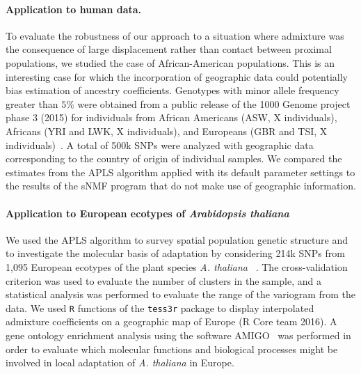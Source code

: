 \paragraph{Application to human data.} To evaluate the robustness of our
approach to a situation where admixture was the consequence of large
displacement rather than contact between proximal populations, we studied the
case of African-American populations. This is an interesting case for which the
incorporation of geographic data could potentially bias estimation of ancestry
coefficients. Genotypes with minor allele frequency greater than $5 \%$ were
obtained from a public release of the
1000 Genome project phase 3 (2015) for individuals from African Americans (ASW,
X individuals), Africans (YRI and LWK, X individuals), and Europeans (GBR and
TSI, X individuals)~\citep{1000genome}. A total of 500k SNPs were analyzed with geographic data
corresponding to the country of origin of individual samples. We compared the
estimates from the APLS algorithm applied with its default parameter settings to
the results of the sNMF program that do not make use of geographic information.

\paragraph{Application to European ecotypes of {\it Arabidopsis thaliana}} We
used the APLS algorithm to survey spatial population genetic structure and to
investigate the molecular basis of adaptation by considering 214k SNPs from
1,095 European ecotypes of the plant species {\it A. thaliana}
~\citep{Horton2012}. The cross-validation criterion was used to evaluate the
number of clusters in the sample, and a statistical analysis was performed to
evaluate the range of the variogram from the data. We used {\tt R} functions of
the {\tt tess3r} package to display interpolated admixture coefficients on a
geographic map of Europe (R Core team 2016). A gene ontology enrichment analysis
using the software AMIGO~\citep{Carbon2009} was performed in order to evaluate
which molecular functions and biological processes might be involved in local
adaptation of {\it A. thaliana} in Europe.


